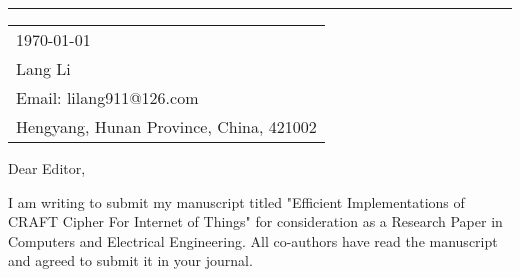 \documentclass{article}
\begin{document}



\rule{\linewidth}{1pt} %

\bigskip\bigskip %


\hfill
\begin{tabular}{l @{}}
\hfill \today \bigskip\\ %
\hfill Lang Li \\
\hfill Email: lilang911@126.com \\
\hfill Hengyang, Hunan Province, China, 421002 \\ %
\end{tabular}

\bigskip %



\bigskip %

Dear Editor,

\bigskip %


I am writing to submit my manuscript titled "Efficient Implementations of CRAFT Cipher For Internet of Things" for consideration as a Research Paper in Computers and Electrical Engineering. All co-authors have read the manuscript and agreed to submit it in your journal.
\end{document}
